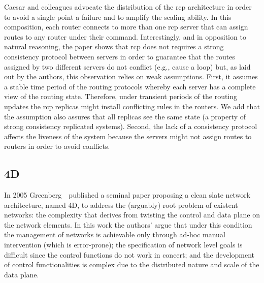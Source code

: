 Caesar and colleagues advocate the distribution of the \gls{rcp} architecture in order to avoid a single point a failure and to amplify  the scaling ability. 
In this composition, each router connects to more than one \gls{rcp} server that can assign routes to any router under their command.
Interestingly, and in opposition to natural reasoning, the paper shows that \gls{rcp} does not requires a strong consistency protocol between servers in order to guarantee that the routes assigned by two different servers do not conflict (e.g., cause a loop) but, as laid out by the authors, this  observation relies on weak assumptions. 
First, it assumes a stable time period of the routing protocols whereby each server has a complete view of the routing state. 
Therefore, under transient periods of the routing updates the \gls{rcp} replicas might install conflicting rules in the routers. 
We add that the assumption also assures that all replicas see the same state (a property of strong consistency replicated systems). 
Second, the lack of a consistency protocol affects the liveness of the system because the servers might not assign routes to routers in order to avoid conflicts. 

\subsection{4D}
In 2005 Greenberg~\etal\ published a seminal paper proposing a clean slate network architecture, named 4D,  to address the (arguably) root problem of existent networks: the complexity that derives from twisting the control and data plane on the network elements. 
In this work the authors' argue that under this condition the management of networks is achievable only through ad-hoc manual intervention (which is error-prone); the specification of network level goals is difficult since the control functions do not work in concert; and the development of control functionalities is complex due to the distributed nature and scale of the data plane. 

